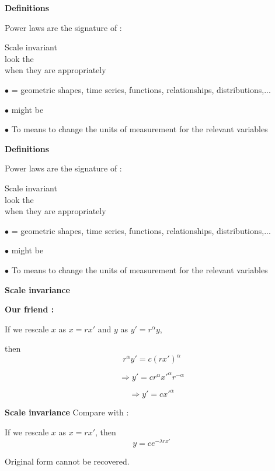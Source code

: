   \textbf{Definitions}

Power laws are the signature of :

Scale invariant \\
look the \\ 
when they are 
appropriately 

{\small $\bullet$  = geometric shapes, time series, functions, relationships, distributions,...}

{\small $\bullet$  might be }

\inv
{\small $\bullet$ To  means to change the units
of measurement for the relevant variables}


  \textbf{Definitions}

Power laws are the signature of :

Scale invariant \\
look the \\ 
when they are 
appropriately 

{\small $\bullet$  = geometric shapes, time series, functions, relationships, distributions,...}

{\small $\bullet$  might be }

{\small $\bullet$ To  means to change the units
of measurement for the relevant variables}



  \textbf{Scale invariance}

  \textbf{Our friend :}
    
    
    If we rescale $x$ as $x = rx'$ and $y$ as $y' = r^\alpha y$,
    
    then
    $$r^\alpha y' = c (rx')^{\alpha}$$
    
    $$\Rightarrow y' = c r^{\alpha} {x'}^{\alpha}r^{-\alpha}$$
    
    $$\Rightarrow y' = c {x'}^{\alpha}$$
    
  


  \textbf{Scale invariance}
Compare with :

\inv
If we rescale $x$ as $x = rx'$, then
$$ y = c e^{-\lambda rx'} $$

Original form cannot be recovered.

